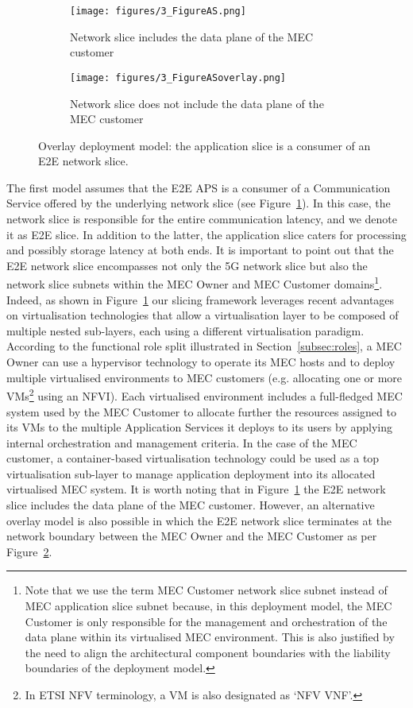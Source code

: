 %
\begin{figure}[ht]
\centering
    \begin{subfigure}[b]{0.5\textwidth}
         \centering
         \texttt{[image: figures/3\_FigureAS.png]}
         \caption{Network slice includes the data plane of the MEC customer}
         \label{3_figAS}
     \end{subfigure}
     \hfill
    \begin{subfigure}[b]{0.5\textwidth}
         \centering
         \texttt{[image: figures/3\_FigureASoverlay.png]}
         \caption{Network slice does not include the data plane of the MEC customer}
         \label{3_figASoverlay}
     \end{subfigure}
\caption{Overlay deployment model: the application slice is a consumer of an E2E network slice.}
\label{fig:overlay}
\end{figure}
%
The first model assumes that the E2E APS is a consumer of a Communication Service offered by the underlying network slice (see Figure~\ref{3_figAS}). In this case, the network slice is responsible for the entire communication latency, and we denote it as E2E  slice. In addition to the latter, the application slice caters for processing and possibly storage latency at both ends. It is important to point out that the E2E network slice encompasses not only the 5G network slice but also the network slice subnets within the MEC Owner and MEC Customer domains\footnote{Note that we use the term MEC Customer network slice subnet instead of MEC application slice subnet because, in this deployment model, the MEC Customer is only responsible for the management and orchestration of the data plane within its virtualised MEC environment. This is also justified by the need to align the architectural component boundaries with the liability boundaries of the deployment model.}. Indeed, as shown in Figure~\ref{3_figAS} our slicing framework leverages recent advantages on virtualisation technologies that allow a virtualisation layer to be composed of multiple nested sub-layers, each using a different virtualisation paradigm. According to the functional role split illustrated in Section~\ref{subsec:roles}, a MEC Owner can use a hypervisor technology to operate its MEC hosts and to deploy multiple virtualised environments to MEC customers (e.g. allocating one or more VMs\footnote{In ETSI NFV terminology, a VM is also designated as `NFV VNF'.} using an NFVI). Each virtualised environment includes a full-fledged MEC system used by the MEC Customer to allocate further the resources assigned to its VMs to the multiple Application Services it deploys to its users by applying internal orchestration and management criteria. In the case of the MEC customer, a container-based virtualisation technology could be used as a top virtualisation sub-layer to manage application deployment into its allocated virtualised MEC system. It is worth noting that in Figure~\ref{3_figAS} the E2E network slice includes the data plane of the MEC customer. However, an alternative overlay model is also possible in which the E2E network slice terminates at the network boundary between the MEC Owner and the MEC Customer as per Figure~\ref{3_figASoverlay}.

